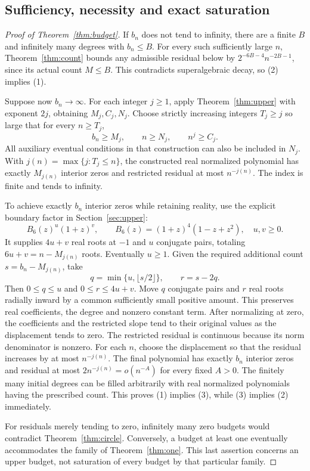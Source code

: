 \documentclass[11pt]{article}
\theoremstyle{remark}\newtheorem{remark}[theorem]{Remark}
\begin{document}
\subsection{Sufficiency, necessity and exact saturation}
\begin{proof}[Proof of Theorem~\ref{thm:budget}]
If \(b_n\) does not tend to infinity, there are a finite \(B\)
and infinitely many degrees with \(b_n\le B\).
For every such sufficiently large \(n\), Theorem~\ref{thm:count}
bounds any admissible residual below by
\(2^{-6B-4}n^{-2B-1}\), since its actual count \(M\le B\).
This contradicts superalgebraic decay, so (2) implies (1).

Suppose now \(b_n\to\infty\). For each integer \(j\ge1\),
apply Theorem~\ref{thm:upper} with exponent \(2j\), obtaining
\(M_j,C_j,N_j\). Choose strictly increasing integers \(T_j\ge j\)
so large that for every \(n\ge T_j\),
\[
 b_n\ge M_j,\qquad n\ge N_j,\qquad n^j\ge C_j.
\]
All auxiliary eventual conditions in that construction can also be
included in \(N_j\). With \(j(n)=\max\{j:T_j\le n\}\), the
constructed real normalized polynomial has exactly \(M_{j(n)}\)
interior zeros and restricted residual at most \(n^{-j(n)}\).
The index is finite and tends to infinity.

To achieve exactly \(b_n\) interior zeros while retaining reality,
use the explicit boundary factor in Section~\ref{sec:upper}:
\[
 B_6(z)^u(1+z)^v,
 \qquad B_6(z)=(1+z)^4(1-z+z^2),\quad u,v\ge0.
\]
It supplies \(4u+v\) real roots at \(-1\) and \(u\)
conjugate pairs, totaling \(6u+v=n-M_{j(n)}\) roots.
Eventually \(u\ge1\). Given the required additional count
\(s=b_n-M_{j(n)}\), take
\[
 q=\min\{u,\lfloor s/2\rfloor\},\qquad r=s-2q.
\]
Then \(0\le q\le u\) and \(0\le r\le4u+v\).
Move \(q\) conjugate pairs and \(r\) real roots radially inward
by a common sufficiently small positive amount. This preserves real
coefficients, the degree and nonzero constant term. After normalizing
at zero, the coefficients and the restricted slope tend to their
original values as the displacement tends to zero. The restricted
residual is continuous because its norm denominator is nonzero.
For each \(n\), choose the displacement so that the residual
increases by at most \(n^{-j(n)}\). The final polynomial has
exactly \(b_n\) interior zeros and residual at most
\(2n^{-j(n)}=o(n^{-A})\) for every fixed \(A>0\).
The finitely many initial degrees can be filled arbitrarily with
real normalized polynomials having the prescribed count.
This proves (1) implies (3), while (3) implies (2) immediately.

For residuals merely tending to zero, infinitely many zero budgets
would contradict Theorem~\ref{thm:circle}. Conversely, a budget
at least one eventually accommodates the family of
Theorem~\ref{thm:one}. This last assertion concerns an upper budget,
not saturation of every budget by that particular family.
\end{proof}
\end{document}
